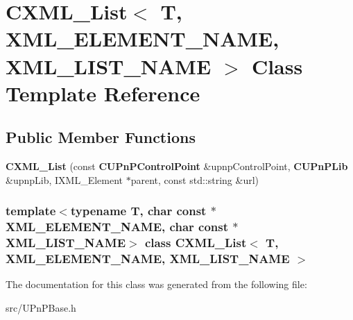 \section{CXML\_\-List$<$ T, XML\_\-ELEMENT\_\-NAME, XML\_\-LIST\_\-NAME $>$ Class Template Reference}
\label{classCXML__List}
\subsection*{Public Member Functions}
\begin{DoxyCompactItemize}
\item 
{\bfseries CXML\_\-List} (const {\bf CUPnPControlPoint} \&upnpControlPoint, {\bf CUPnPLib} \&upnpLib, IXML\_\-Element $\ast$parent, const std::string \&url)\label{classCXML__List_a6c3113ed55e2a74cceb105fc830aca71}

\end{DoxyCompactItemize}
\subsubsection*{template$<$typename T, char const $\ast$ XML\_\-ELEMENT\_\-NAME, char const $\ast$ XML\_\-LIST\_\-NAME$>$ class CXML\_\-List$<$ T, XML\_\-ELEMENT\_\-NAME, XML\_\-LIST\_\-NAME $>$}



The documentation for this class was generated from the following file:\begin{DoxyCompactItemize}
\item 
src/UPnPBase.h\end{DoxyCompactItemize}
